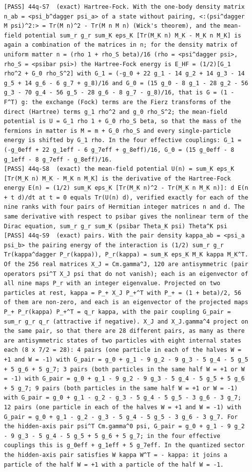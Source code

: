 \documentclass[
  10pt,
]{article}
\begin{document}
\begin{verbatim}
[PASS] 44q-S7  (exact) Hartree-Fock. With the one-body density matrix n_ab = <psi_b^dagger psi_a> of a state without pairing, <:(psi^dagger M psi)^2:> = Tr(M n)^2 - Tr(M n M n) (Wick's theorem), and the mean-field potential sum_r g_r sum_K eps_K [Tr(M_K n) M_K - M_K n M_K] is again a combination of the matrices in n; for the density matrix of uniform matter n = (rho 1 + rho_S beta)/16 (rho = <psi^dagger psi>, rho_S = <psibar psi>) the Hartree-Fock energy is E_HF = (1/2)[G_1 rho^2 + G_0 rho_S^2] with G_1 = (-g_0 + 22 g_1 - 14 g_2 + 14 g_3 - 14 g_5 + 14 g_6 - 6 g_7 + g_8)/16 and G_0 = (15 g_0 - 8 g_1 - 28 g_2 - 56 g_3 - 70 g_4 - 56 g_5 - 28 g_6 - 8 g_7 - g_8)/16, that is G = (1 - F^T) g: the exchange (Fock) terms are the Fierz transforms of the direct (Hartree) terms g_1 rho^2 and g_0 rho_S^2; the mean-field potential is U = G_1 rho 1 + G_0 rho_S beta, so that the mass of the fermions in matter is M = m + G_0 rho_S and every single-particle energy is shifted by G_1 rho. In the four effective couplings: G_1 = (-g_0eff + 22 g_1eff - 6 g_7eff + g_8eff)/16, G_0 = (15 g_0eff - 8 g_1eff - 8 g_7eff - g_8eff)/16.
[PASS] 44q-S8  (exact) the mean-field potential U(n) = sum_K eps_K [Tr(M_K n) M_K - M_K n M_K] is the derivative of the Hartree-Fock energy E(n) = (1/2) sum_K eps_K [Tr(M_K n)^2 - Tr(M_K n M_K n)]: d E(n + t d)/dt at t = 0 equals Tr(U(n) d), verified exactly for each of the nine ranks with four pairs of Hermitian integer matrices n and d. The same derivative with respect to psibar gives the nonlinear term of the Dirac equation, sum_r g_r sum_K (psibar Theta_K psi) Theta^K psi
[PASS] 44q-S9  (exact) pairs. With the pair density kappa_ab = <psi_a psi_b> the pairing energy of the interaction is (1/2) sum_r g_r Tr(kappa^dagger P_r(kappa)), P_r(kappa) = sum_K eps_K M_K kappa M_K^T. Of the 256 real matrices X_J = Cm.gamma^J, 120 are antisymmetric (pair operators psi^T X_J psi that do not vanish); each is an eigenvector of all nine maps P_r with an integer eigenvalue. Projected on two particles at rest, kappa = P_+ X_J P_+^T with P_+ = (1 + beta)/2, 56 of them are non-zero, and each is an eigenvector of the projected maps P_+ P_r(kappa) P_+^T = q_r kappa, with the pair coupling G_pair = sum_r g_r q_r (attractive if negative). X_J and X_J.gamma^4 project on the same pair, so that there are 28 different pairs, as many as there are antisymmetric states of two particles with eight internal states each (8 x 7/2 = 28): 4 pairs (one particle in each of the halves W = +1 and W = -1) with G_pair = g_0 + g_1 - 9 g_2 - 9 g_3 - 5 g_4 - 5 g_5 + 5 g_6 + 5 g_7; 3 pairs (both particles in the same half W = +1 or W = -1) with G_pair = g_0 + g_1 - 9 g_2 - 9 g_3 - 5 g_4 - 5 g_5 + 5 g_6 + 5 g_7; 9 pairs (both particles in the same half W = +1 or W = -1) with G_pair = g_0 + g_1 - g_2 - g_3 - 5 g_4 - 5 g_5 - 3 g_6 - 3 g_7; 12 pairs (one particle in each of the halves W = +1 and W = -1) with G_pair = g_0 + g_1 - g_2 - g_3 - 5 g_4 - 5 g_5 - 3 g_6 - 3 g_7. For the hidden-axis pair psi^T Cm.gamma^0 psi, G_pair = g_0 + g_1 - 9 g_2 - 9 g_3 - 5 g_4 - 5 g_5 + 5 g_6 + 5 g_7; in the four effective couplings this is g_0eff + g_1eff + 5 g_7eff. In the quantized sector the hidden-axis pair satisfies W kappa W^T = - kappa: it joins a particle of the half W = +1 with a particle of the half W = -1.

\end{verbatim}
\end{document}
